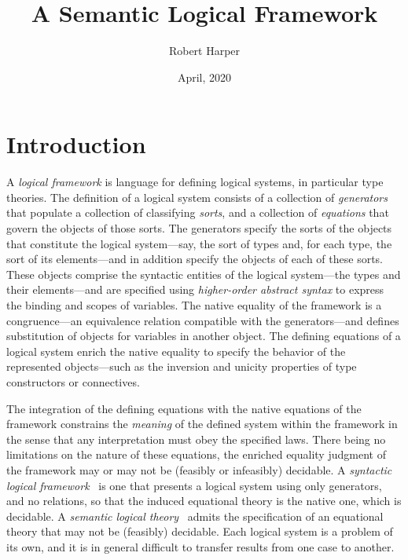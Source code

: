 \documentclass[11pt,twoside]{article}
\begin{document}
\title{A Semantic Logical Framework}
\author{Robert Harper}
\date{April, 2020}

\maketitle{}

\section{Introduction}

A \emph{logical framework} is language for defining logical systems, in particular type
theories.  The definition of a logical system consists of a collection of
\emph{generators} that populate a collection of classifying \emph{sorts}, and a collection
of \emph{equations} that govern the objects of those sorts.  The generators specify the
sorts of the objects that constitute the logical system---say, the sort of types and, for
each type, the sort of its elements---and in addition specify the objects of each of these
sorts.  These objects comprise the syntactic entities of the logical system---the types and
their elements---and are specified using \emph{higher-order abstract syntax} to express the
binding and scopes of variables.  The native equality of the framework is a congruence---an
equivalence relation compatible with the generators---and defines substitution of objects
for variables in another object.  The defining equations of a logical system enrich the
native equality to specify the behavior of the represented objects---such as the inversion
and unicity properties of type constructors or connectives.

The integration of the defining equations with the native equations of the framework
constrains the \emph{meaning} of the defined system within the framework in the sense that
any interpretation must obey the specified laws.  There being no limitations on the nature
of these equations, the enriched equality judgment of the framework may or may not be
(feasibly or infeasibly) decidable.  A \emph{syntactic logical
  framework}~\cite{harper-etal:lf} is one that presents a logical system using only
generators, and no relations, so that the induced equational theory is the native one,
which is decidable.  A \emph{semantic logical theory}~\cite{smith1990programming} admits
the specification of an equational theory that may not be (feasibly) decidable.  Each
logical system is a problem of its own, and it is in general difficult to transfer results
from one case to another.
\end{document}
